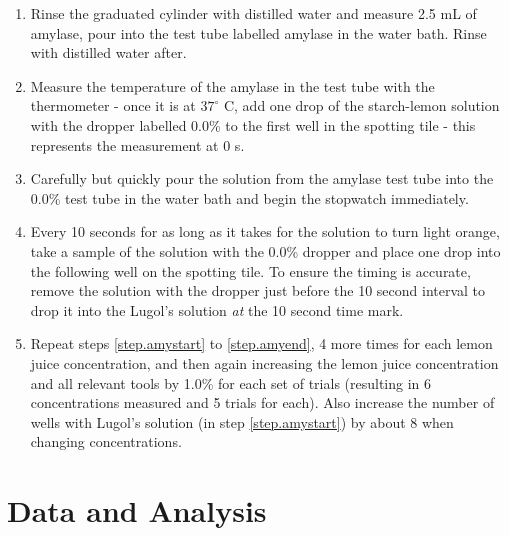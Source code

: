 \documentclass[12pt]{article}
\begin{document}
\begin{enumerate}
    \item Rinse the graduated cylinder with distilled water and measure 2.5 mL of amylase, pour into the test tube labelled amylase in the water bath. Rinse with distilled water after.
    \item Measure the temperature of the amylase in the test tube with the thermometer - once it is at $37^\circ$ C, add one drop of the starch-lemon solution with the dropper labelled 0.0\% to the first well in the spotting tile - this represents the measurement at 0 s. 
    \item Carefully but quickly pour the solution from the amylase test tube into the 0.0\% test tube in the water bath and begin the stopwatch immediately. 
    \item\label{step.amyend} Every 10 seconds for as long as it takes for the solution to turn light orange, take a sample of the solution with the 0.0\% dropper and place one drop into the following well on the spotting tile. To ensure the timing is accurate, remove the solution with the dropper just before the 10 second interval to drop it into the Lugol's solution \textit{at} the 10 second time mark.
    \item Repeat steps \ref{step.amystart} to \ref{step.amyend}, 4 more times for each lemon juice concentration, and then again increasing the lemon juice concentration and all relevant tools by 1.0\% for each set of trials (resulting in 6 concentrations measured and 5 trials for each). Also increase the number of wells with Lugol's solution (in step \ref{step.amystart}) by about 8 when changing concentrations. 
\end{enumerate}

\section{Data and Analysis}
\end{document}
